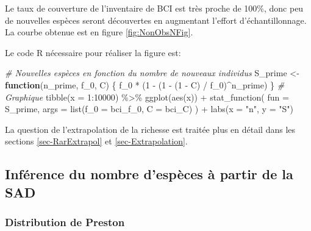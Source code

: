 \documentclass[
  11pt,
  american,
  a4paper,
  extrafontsizes,onecolumn,openright
  ]{memoir}
\newenvironment{Shaded}{\begin{snugshade}}{\end{snugshade}}
\newcommand{\AttributeTok}[1]{\textcolor[rgb]{0.77,0.63,0.00}{#1}}
\newcommand{\CommentTok}[1]{\textcolor[rgb]{0.56,0.35,0.01}{\textit{#1}}}
\newcommand{\ControlFlowTok}[1]{\textcolor[rgb]{0.13,0.29,0.53}{\textbf{#1}}}
\newcommand{\DecValTok}[1]{\textcolor[rgb]{0.00,0.00,0.81}{#1}}
\newcommand{\FunctionTok}[1]{\textcolor[rgb]{0.00,0.00,0.00}{#1}}
\newcommand{\NormalTok}[1]{#1}
\newcommand{\OtherTok}[1]{\textcolor[rgb]{0.56,0.35,0.01}{#1}}
\newcommand{\SpecialCharTok}[1]{\textcolor[rgb]{0.00,0.00,0.00}{#1}}
\newcommand{\StringTok}[1]{\textcolor[rgb]{0.31,0.60,0.02}{#1}}
\begin{document}
\normalsize

Le taux de couverture de l'inventaire de BCI est très proche de 100\%, donc peu de nouvelles espèces seront découvertes en augmentant l'effort d'échantillonnage.
La courbe obtenue est en figure \ref{fig:NonObsNFig}.

Le code R nécessaire pour réaliser la figure est:

\scriptsize

\begin{Shaded}
\begin{Highlighting}[]
\CommentTok{\# Nouvelles espèces en fonction du nombre de nouveaux individus}
\NormalTok{S\_prime }\OtherTok{\textless{}{-}} \ControlFlowTok{function}\NormalTok{(n\_prime, f\_0, C) \{}
\NormalTok{  f\_0 }\SpecialCharTok{*}\NormalTok{ (}\DecValTok{1} \SpecialCharTok{{-}}\NormalTok{ (}\DecValTok{1} \SpecialCharTok{{-}}\NormalTok{ (}\DecValTok{1} \SpecialCharTok{{-}}\NormalTok{ C) }\SpecialCharTok{/}\NormalTok{ f\_0)}\SpecialCharTok{\^{}}\NormalTok{n\_prime)}
\NormalTok{\}}
\CommentTok{\# Graphique}
\FunctionTok{tibble}\NormalTok{(}\AttributeTok{x =} \DecValTok{1}\SpecialCharTok{:}\DecValTok{10000}\NormalTok{) }\SpecialCharTok{\%\textgreater{}\%} 
  \FunctionTok{ggplot}\NormalTok{(}\FunctionTok{aes}\NormalTok{(x)) }\SpecialCharTok{+} 
  \FunctionTok{stat\_function}\NormalTok{(}
    \AttributeTok{fun =}\NormalTok{ S\_prime, }
    \AttributeTok{args =} \FunctionTok{list}\NormalTok{(}\AttributeTok{f\_0 =}\NormalTok{ bci\_f\_0, }\AttributeTok{C =}\NormalTok{ bci\_C)}
\NormalTok{  ) }\SpecialCharTok{+}
  \FunctionTok{labs}\NormalTok{(}\AttributeTok{x =} \StringTok{"n\textquotesingle{}"}\NormalTok{, }\AttributeTok{y =} \StringTok{"S\textquotesingle{}"}\NormalTok{)}
\end{Highlighting}
\end{Shaded}

\normalsize

La question de l'extrapolation de la richesse est traitée plus en détail dans les sections \ref{sec-RarExtrapol} et \ref{sec-Extrapolation}.

\hypertarget{infuxe9rence-du-nombre-despuxe8ces-uxe0-partir-de-la-sad}{%
\subsection{Inférence du nombre d'espèces à partir de la SAD}\label{infuxe9rence-du-nombre-despuxe8ces-uxe0-partir-de-la-sad}}

\hypertarget{distribution-de-preston}{%
\subsubsection{Distribution de Preston}\label{distribution-de-preston}}
\end{document}

